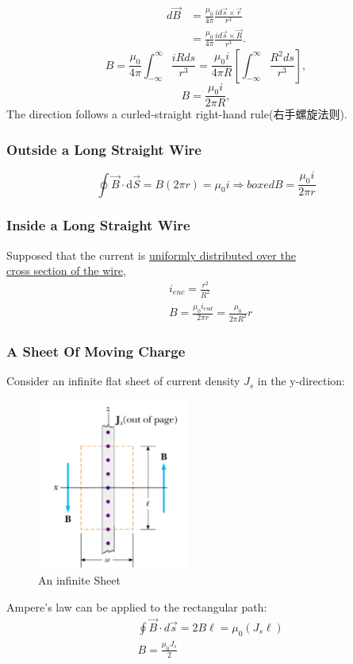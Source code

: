 \documentclass[11pt, a4paper]{article}
\begin{document}
$$\begin{aligned}
    d \vec{B}& =\frac{\mu_0}{4\pi}\frac{id\vec{s}\times\vec{r}}{r^3}  \\
    &=\frac{\mu_0}{4\pi}\frac{id\vec{s}\times\vec{R}}{r^3}.
\end{aligned}$$
$$B=\frac{\mu_0}{4\pi}\int_{-\infty}^\infty\frac{iRds}{r^3}=\frac{\mu_0i}{4\pi R}\left[\int_{-\infty}^\infty\frac{R^2ds}{r^3}\right],$$    
$$B=\frac{\mu_0i}{2\pi R},$$
The direction follows a curled-straight right-hand rule(右手螺旋法则).

\subsubsection{Outside a Long Straight Wire}
$$\oint\vec{B}\cdot \mathrm{d}\vec{S} = B(2\pi r) = \mu_0 i \Rightarrow boxed{B = \frac{\mu_0 i}{2\pi r}}$$
\subsubsection{Inside a Long Straight Wire}
Supposed that the current is \underline{uniformly distributed over the\\
cross section of the wire},
$$\begin{aligned}
    &i_{enc} = \frac{r^2}{R^2}\\
    &B = \frac{\mu_0 i_{end}}{2\pi r} = \frac{\mu_0}{2\pi R^2}r
\end{aligned}$$

\subsubsection{A Sheet Of Moving Charge}
Consider an infinite flat sheet of current density $J_s$
in the y-direction:
\begin{figure}
    \centering
    \includegraphics[width = 5cm]{Sheet of Moving Charge.png}
    \caption{An infinite Sheet}
\end{figure}
Ampere’s law can be applied to the
rectangular path:
$$\begin{aligned}&\oint\vec{B}\cdot d\vec{s}=2B\ell=\mu_0(J_s\ell)\\
&B = \frac{\mu_0 J_s}{2}\end{aligned}$$
\end{document}
